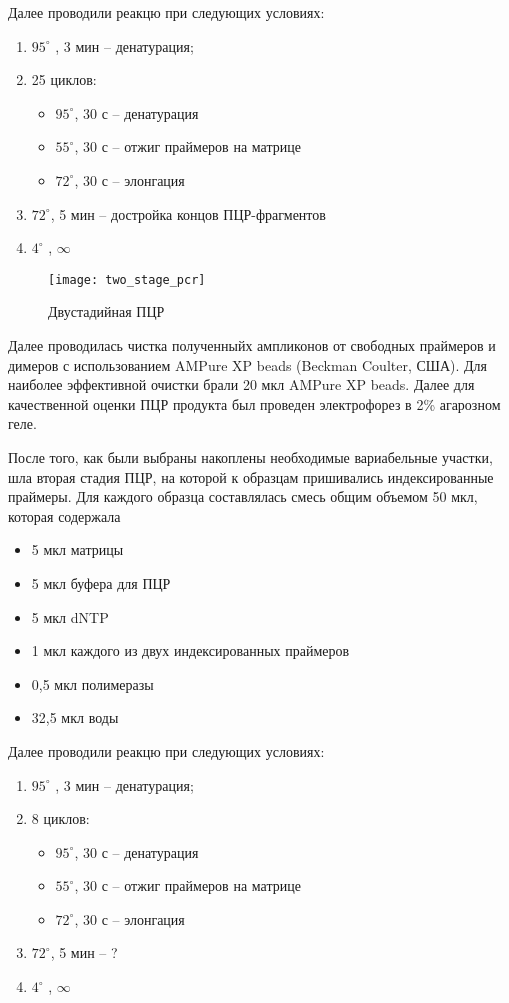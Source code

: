 Далее проводили реакцю при следующих условиях:

\begin{enumerate}
	\item $95^{\circ}$ , 3 мин – денатурация;
	\item 25 циклов:
	\begin{itemize}
		\item $95^{\circ}$, 30 с – денатурация
		\item $55^{\circ}$, 30 с – отжиг праймеров на матрице
		\item $72^{\circ}$, 30 с – элонгация	
	\end{itemize}
	\item $72^{\circ}$, 5 мин – достройка концов ПЦР-фрагментов 
	\item  $4^{\circ}$ ,  $\infty$ 
\end{enumerate}

\begin{figure}[h]
  \texttt{[image: two\_stage\_pcr]}
  \centering
  \caption{Двустадийная ПЦР}
  \label{img:two_stage_pcr}  
\end{figure}

Далее проводилась чистка полученныйх ампликонов от свободных праймеров и димеров с использованием AMPure XP beads (Beckman Coulter, США). Для наиболее эффективной очистки брали  20 мкл AMPure XP beads. Далее для качественной оценки ПЦР продукта был проведен электрофорез в 2\% агарозном геле. 

После того, как были выбраны накоплены необходимые вариабельные участки, шла вторая стадия ПЦР, на которой к образцам пришивались индексированные праймеры.  Для каждого образца составлялась смесь общим объемом 50 мкл, которая содержала 

\begin{itemize}
\item 5 мкл матрицы
\item 5 мкл буфера для ПЦР
\item 5 мкл dNTP
\item 1 мкл каждого из двух индексированных праймеров
\item 0,5 мкл полимеразы
\item 32,5 мкл воды
\end{itemize}

Далее проводили реакцю при следующих условиях:

\begin{enumerate}
	\item $95^{\circ}$ , 3 мин – денатурация;
	\item 8 циклов:
	\begin{itemize}
		\item $95^{\circ}$, 30 с – денатурация
		\item $55^{\circ}$, 30 с – отжиг праймеров на матрице
		\item $72^{\circ}$, 30 с – элонгация
	\end{itemize}
	\item $72^{\circ}$, 5 мин – ?
	\item $4^{\circ}$ ,  $\infty$
\end{enumerate}

